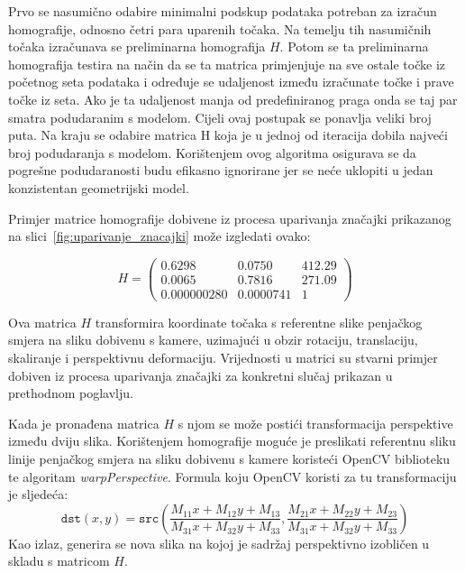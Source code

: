 Prvo se nasumično odabire minimalni podskup podataka potreban za izračun homografije, odnosno četri para uparenih točaka. Na temelju tih nasumičnih točaka izračunava se preliminarna homografija $H$. Potom se ta preliminarna homografija testira na način da se ta matrica primjenjuje na sve ostale točke iz početnog seta podataka i određuje se udaljenost između izračunate točke i prave točke iz seta. Ako je ta udaljenost manja od predefiniranog praga onda se taj par smatra podudaranim s modelom. Cijeli ovaj postupak se ponavlja veliki broj puta. 
Na kraju se odabire matrica H koja je u jednoj od iteracija dobila najveći broj podudaranja s modelom. Korištenjem ovog algoritma osigurava se da pogrešne podudaranosti budu efikasno ignorirane jer se neće uklopiti u jedan konzistentan geometrijski model.

Primjer matrice homografije dobivene iz procesa uparivanja značajki prikazanog na slici~\ref{fig:uparivanje_znacajki} može izgledati ovako:

\begin{equation}
    H =
    \begin{pmatrix}
        0.6298 & 0.0750 & 412.29 \\
        0.0065 & 0.7816 & 271.09 \\
        0.000000280 & 0.0000741 & 1
    \end{pmatrix}
\end{equation}

Ova matrica $H$ transformira koordinate točaka s referentne slike penjačkog smjera na sliku dobivenu s kamere, uzimajući u obzir rotaciju, translaciju, skaliranje i perspektivnu deformaciju. Vrijednosti u matrici su stvarni primjer dobiven iz procesa uparivanja značajki za konkretni slučaj prikazan u prethodnom poglavlju.




Kada je pronađena matrica $H$ s njom se može postići transformacija perspektive između dviju slika. Korištenjem homografije moguće je preslikati referentnu sliku linije penjačkog smjera na sliku dobivenu s kamere koristeći OpenCV biblioteku te algoritam \textit{warpPerspective}. Formula koju OpenCV koristi za tu transformaciju je sljedeća:
\begin{equation}
    \texttt{dst}(x,y) = \texttt{src} \left ( \frac{M_{11} x + M_{12} y + M_{13}}{M_{31} x + M_{32} y + M_{33}} ,
     \frac{M_{21} x + M_{22} y + M_{23}}{M_{31} x + M_{32} y + M_{33}} \right )
\end{equation}
Kao izlaz, generira se nova slika na kojoj je sadržaj perspektivno izobličen u skladu s matricom $H$. 

